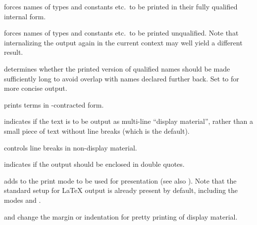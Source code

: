 \begin{isabellebody}
\begin{isamarkuptext}
\begin{descr}
  \item[\isa{{\isachardoublequote}long{\isacharunderscore}names\ {\isacharequal}\ bool{\isachardoublequote}}] forces names of types and
  constants etc.\ to be printed in their fully qualified internal
  form.

  \item[\isa{{\isachardoublequote}short{\isacharunderscore}names\ {\isacharequal}\ bool{\isachardoublequote}}] forces names of types and
  constants etc.\ to be printed unqualified.  Note that internalizing
  the output again in the current context may well yield a different
  result.

  \item[\isa{{\isachardoublequote}unique{\isacharunderscore}names\ {\isacharequal}\ bool{\isachardoublequote}}] determines whether the printed
  version of qualified names should be made sufficiently long to avoid
  overlap with names declared further back.  Set to  for
  more concise output.

  \item[\isa{{\isachardoublequote}eta{\isacharunderscore}contract\ {\isacharequal}\ bool{\isachardoublequote}}] prints terms in \isa{{\isasymeta}}-contracted form.

  \item[\isa{{\isachardoublequote}display\ {\isacharequal}\ bool{\isachardoublequote}}] indicates if the text is to be
  output as multi-line ``display material'', rather than a small piece
  of text without line breaks (which is the default).

  \item[\isa{{\isachardoublequote}break\ {\isacharequal}\ bool{\isachardoublequote}}] controls line breaks in non-display
  material.

  \item[\isa{{\isachardoublequote}quotes\ {\isacharequal}\ bool{\isachardoublequote}}] indicates if the output should be
  enclosed in double quotes.

  \item[\isa{{\isachardoublequote}mode\ {\isacharequal}\ name{\isachardoublequote}}] adds  to the print mode to
  be used for presentation (see also \cite{isabelle-ref}).  Note that
  the standard setup for {\LaTeX} output is already present by
  default, including the modes  and .

  \item[\isa{{\isachardoublequote}margin\ {\isacharequal}\ nat{\isachardoublequote}} and \isa{{\isachardoublequote}indent\ {\isacharequal}\ nat{\isachardoublequote}}] change the
  margin or indentation for pretty printing of display material.


\end{descr}
\end{isamarkuptext}
\end{isabellebody}
